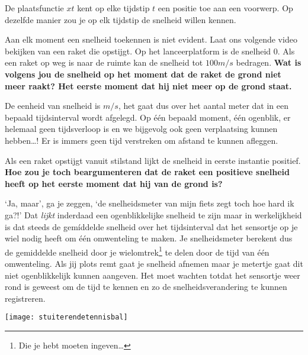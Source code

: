 \documentclass{ximera}
\begin{document}
De plaatsfunctie \(x{t}\) kent op elke tijdstip \(t\) een positie toe aan een voorwerp. Op dezelfde manier zou je op elk tijdstip de snelheid willen kennen. 

\begin{denkvraag}
Aan elk moment een snelheid toekennen is niet evident. Laat ons volgende video bekijken van een raket die opstijgt. Op het lanceerplatform is de snelheid \(0\). Als een raket op weg is naar de ruimte kan de snelheid tot \(100 m/s \) bedragen. \textbf{Wat is volgens jou de snelheid op het moment dat de raket de grond niet meer raakt? Het eerste moment dat hij niet meer op de grond staat.}
\end{denkvraag}

De eenheid van snelheid is \(m/s\), het gaat dus over het aantal meter dat in een bepaald tijds\-in\-ter\-val wordt afgelegd. Op \'e\'en bepaald moment, \'e\'en ogenblik, er helemaal geen tijdsverloop is en we bijgevolg ook geen verplaatsing kunnen hebben\ldots! Er is immers geen tijd verstreken om afstand te kunnen afleggen.

\begin{denkvraag}
Als een raket opstijgt vanuit stilstand lijkt de snelheid in eerste instantie positief. \textbf{Hoe zou je toch beargumenteren dat de raket een positieve snelheid heeft op het eerste moment dat hij van de grond is?}

\end{denkvraag}

`Ja, maar', ga je zeggen, `de snelheidsmeter van mijn fiets zegt toch hoe hard ik ga?!' Dat \emph{lijkt} inderdaad een ogenblikkelijke snelheid te zijn maar in werkelijkheid is dat steeds de gem\'iddelde snelheid over het \mbox{tijds}\-in\-ter\-val dat het sensortje op je wiel nodig heeft om \'e\'en omwenteling te maken. Je snelheidsmeter berekent dus de gemiddelde snelheid door je wielomtrek\footnote{Die je hebt moeten ingeven\ldots} te delen door de tijd van \'e\'en omwenteling. Als jij plots remt gaat je snelheid afnemen maar je metertje gaat dit niet ogenblikkelijk kunnen aangeven. Het moet wachten totdat het sensortje weer rond is geweest om de tijd te kennen en zo de snelheidsverandering te kunnen registreren.
\begin{image}

\texttt{[image: stuiterendetennisbal]}
\end{image}
\end{document}
